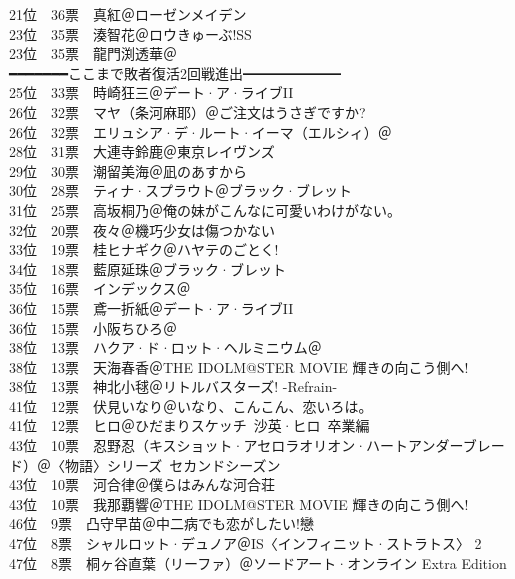 {    21位　36票　真紅＠ローゼンメイデン\\
    23位　35票　湊智花＠ロウきゅーぶ!SS\\
    23位　35票　龍門渕透華＠\Saki\\
    ━━━━━━━ここまで敗者復活2回戦進出━━━━━━━\\
    25位　33票　時崎狂三＠デート·ア·ライブII\\
    26位　32票　マヤ（条河麻耶）＠ご注文はうさぎですか?\\
    26位　32票　エリュシア·デ·ルート·イーマ（エルシィ）＠\Kaminomi\\
    28位　31票　大連寺鈴鹿＠東京レイヴンズ\\
    29位　30票　潮留美海＠凪のあすから\\
    30位　28票　ティナ·スプラウト＠ブラック·ブレット\\
    31位　25票　高坂桐乃＠俺の妹がこんなに可愛いわけがない。\\
    32位　20票　夜々＠機巧少女は傷つかない\\
    33位　19票　桂ヒナギク＠ハヤテのごとく!\\
    34位　18票　藍原延珠＠ブラック·ブレット\\
    35位　16票　インデックス＠\Railgan\\
    36位　15票　鳶一折紙＠デート·ア·ライブII\\
    36位　15票　小阪ちひろ＠\Kaminomi\\
    38位　13票　ハクア·ド·ロット·ヘルミニウム＠\Kaminomi\\
    38位　13票　天海春香＠THE IDOLM@STER MOVIE 輝きの向こう側へ!\\
    38位　13票　神北小毬＠リトルバスターズ! -Refrain-\\
    41位　12票　伏見いなり＠いなり、こんこん、恋いろは。\\
    41位　12票　ヒロ＠ひだまりスケッチ~沙英·ヒロ~卒業編\\
    43位　10票　忍野忍（キスショット·アセロラオリオン·ハートアンダーブレード）＠〈物語〉シリーズ~セカンドシーズン\\
    43位　10票　河合律＠僕らはみんな河合荘\\
    43位　10票　我那覇響＠THE IDOLM@STER MOVIE 輝きの向こう側へ!\\
    46位　9票　凸守早苗＠中二病でも恋がしたい!戀\\
    47位　8票　シャルロット·デュノア＠IS〈インフィニット·ストラトス〉 2\\
    47位　8票　桐ヶ谷直葉（リーファ）＠ソードアート·オンライン Extra Edition\\
}
